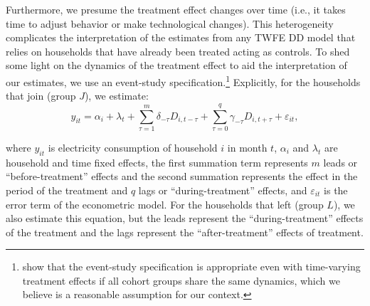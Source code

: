 \documentclass[12pt]{article}
\begin{document}
Furthermore, we presume the treatment effect changes over time (i.e., it takes time to adjust behavior or make technological changes). This heterogeneity complicates the interpretation of the estimates from any TWFE DD model that relies on households that have already been treated acting as controls. To shed some light on the dynamics of the treatment effect to aid the interpretation of our estimates, we use an event-study specification.\footnote{\citet{sunEstimatingDynamicTreatment2020a} show that the event-study specification is appropriate even with time-varying treatment effects if all cohort groups share the same dynamics, which we believe is a reasonable assumption for our context. } Explicitly, for the households that join (group $J$), we estimate:
\begin{equation}
	y_{it} = \alpha_{i} + \lambda_{t} + \sum_{\tau = 1}^{m} \delta_{- \tau}    D_{i,t - \tau} + \sum_{ \tau = 0}^{q} \gamma_{-\tau} D_{i,t + \tau} + \varepsilon_{it},
\end{equation}

where $y_{it}$ is electricity consumption of household $i$ in month $t$, $\alpha_{i}$ and $\lambda_{t}$ are household and time fixed effects, the first summation term represents $m$ leads or \enquote{before-treatment} effects and the second summation represents the effect in the period of the treatment and $q$ lags or \enquote{during-treatment} effects, and $\varepsilon_{it}$ is the error term of the econometric model. For the households that left (group $L$), we also estimate this equation, but the leads represent the \enquote{during-treatment} effects of the treatment and the lags represent the \enquote{after-treatment} effects of treatment.
\end{document}
